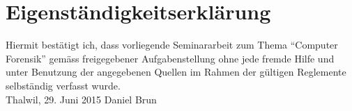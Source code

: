 
\chapter*{Eigenständigkeitserklärung}
\thispagestyle{empty}
%
Hiermit bestätigt ich, dass vorliegende Seminararbeit zum Thema "`Computer Forensik"'
gemäss freigegebener Aufgabenstellung ohne jede fremde Hilfe und unter Benutzung der angegebenen Quellen im Rahmen der gültigen Reglemente selbständig verfasst wurde. 
%
\mbox{}\vspace{4\baselineskip}\\
%
Thalwil, 29. Juni 2015 \hfill Daniel Brun
\clearpage\mbox{}\thispagestyle{empty}


%

